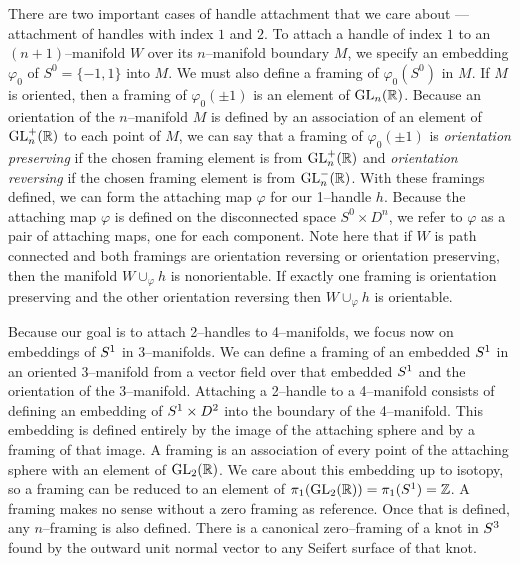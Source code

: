 \begin{rmk}
\label{rmk:onehandle}
There are two important cases of handle attachment that we care about --- attachment of handles with index $1$ and $2$.
To attach a handle of index $1$ to an $(n+1)$--manifold $W$ over its $n$--manifold boundary $M$, we specify an embedding $\varphi_0$ of $S^0=\{-1,1\}$ into $M$.
We must also define a framing of $\varphi_0(S^{0})$ in $M$.
If $M$ is oriented, then a framing of $\varphi_0(\pm 1)$ is an element of $\textrm{GL}_{n}(\mathbb{R})$.
Because an orientation of the $n$--manifold $M$ is defined by an association of an element of $\textrm{GL}_{n}^+(\mathbb{R})$ to each point of $M$, we can say that a framing of $\varphi_0(\pm 1)$ is \emph{orientation preserving} if the chosen framing element is from $\textrm{GL}_{n}^+(\mathbb{R})$ and \emph{orientation reversing} if the chosen framing element is from $\textrm{GL}_{n}^-(\mathbb{R})$.
With these framings defined, we can form the attaching map $\varphi$ for our 1--handle $h$.
Because the attaching map $\varphi$ is defined on the disconnected space $S^0\times D^n$, we refer to $\varphi$ as a pair of attaching maps, one for each component. 
Note here that if $W$ is path connected and both framings are orientation reversing or orientation preserving, then the manifold $W\cup_\varphi h$ is nonorientable.
If exactly one framing is orientation preserving and the other orientation reversing then $W\cup_\varphi h$ is orientable.
\end{rmk}



Because our goal is to attach 2--handles to 4--manifolds, we focus now on embeddings of $S^1$ in 3--manifolds.
We can define a framing of an embedded $S^1$ in an oriented 3--manifold from a vector field over that embedded $S^1$ and the orientation of the 3--manifold.
Attaching a 2--handle to a 4--manifold consists of defining an embedding of $S^1\times D^2$ into the boundary of the 4--manifold.
This embedding is defined entirely by the image of the attaching sphere and by a framing of that image.
A framing is an association of every point of the attaching sphere with an element of $\textrm{GL}_{2}(\mathbb{R})$.
We care about this embedding up to isotopy, so a framing can be reduced to an element of $\pi_1(\textrm{GL}_{2}(\mathbb{R}))=\pi_1(S^1)=\mathbb{Z}$.
A framing makes no sense without a zero framing as reference.
Once that is defined, any $n$--framing is also defined.
There is a canonical zero--framing of a knot in $S^3$ found by the outward unit normal vector to any Seifert surface of that knot.
